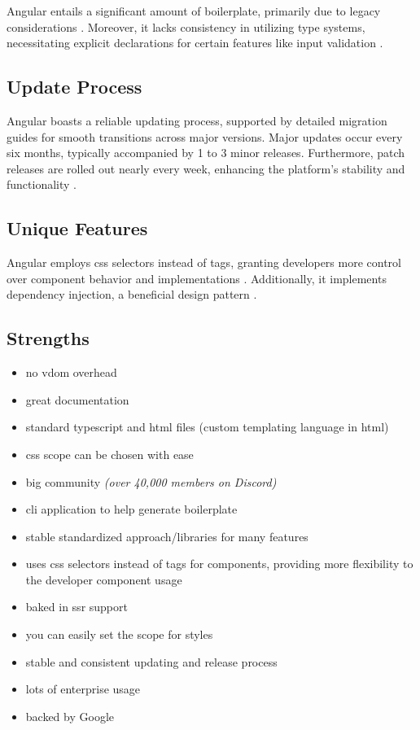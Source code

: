 Angular entails a significant amount of boilerplate, primarily due to legacy considerations \cite{angulardev:directive_composition_api}. Moreover, it lacks consistency in utilizing type systems, necessitating explicit declarations for certain features like input validation \cite{angulardev:inputs, typescript:objects}.

\subsection{Update Process}

Angular boasts a reliable updating process, supported by detailed migration guides for smooth transitions across major versions. Major updates occur every six months, typically accompanied by 1 to 3 minor releases. Furthermore, patch releases are rolled out nearly every week, enhancing the platform's stability and functionality \cite{angulardev:versioning_and_releases}.

\subsection{Unique Features}

Angular employs \acrshort{css} selectors instead of tags, granting developers more control over component behavior and implementations \cite{angulardev:component_selectors}. Additionally, it implements dependency injection, a beneficial design pattern \cite{stackify:dependency_injection, angulardev:dependency_injection}.

\subsection{Strengths}
\label{subsec:angular:strengths}
\begin{itemize}
    \item no \acrshort{vdom} overhead
    \item great documentation
    \item standard typescript and \acrshort{html} files (custom templating language in \acrshort{html})
    \item \acrshort{css} scope can be chosen with ease
    \item big community \textit{(over 40,000 members on Discord)}
    \item \acrshort{cli} application to help generate boilerplate
    \item stable standardized approach/libraries for many features
    \item uses \acrshort{css} selectors instead of tags for components, providing more flexibility to the developer component usage
    \item baked in \acrshort{ssr} support
    \item you can easily set the scope for styles
    \item stable and consistent updating and release process
    \item lots of enterprise usage
    \item backed by Google
\end{itemize}

